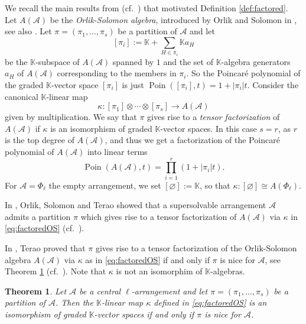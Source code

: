 \documentclass[12pt]{amsart}
\newcommand\CA{{\mathscr A}}
\newcommand\BBK{{\mathbb K}}
\newcommand\Poin{{\operatorname{Poin}}}
\numberwithin{equation}{section}
\theoremstyle{plain}
\newtheorem{theorem}[equation]{Theorem}
\theoremstyle{definition}
\begin{document}
We recall the main results from \cite{terao:factored}
(cf.\  \cite[\S 3.3]{orlikterao:arrangements}) that motivated
Definition \ref{def:factored}.
Let $A(\CA)$ be the \emph{Orlik-Solomon algebra}, introduced by Orlik and Solomon in \cite{orliksolomon:hyperplanes}, see also \cite{orlikterao:arrangements}.
Let $\pi = (\pi_1, \ldots, \pi_s)$ be a partition of $\CA$ and let
\[
[\pi_i] := \BBK + \sum_{H\in \pi_i} \BBK a_H
\]
be the $\BBK$-subspace of $A(\CA)$
spanned by $1$ and the set of $\BBK$-algebra generators $a_H$
of $A(\CA)$ corresponding to the members in $\pi_i$.
So the Poincar\'e polynomial of the graded $\BBK$-vector space $[\pi_i]$ is just
$\Poin([\pi_i],t) = 1 + | \pi_i| t$.
Consider the canonical $\BBK$-linear map
\begin{equation}
	\label{eq:factoredOS}
	\kappa : [\pi_1] \otimes \cdots \otimes [\pi_s] \to A(\CA)
\end{equation}
given by multiplication. We say that $\pi$ gives
rise to a \emph{tensor factorization} of
$A(\CA)$
if $\kappa$ is an isomorphism of graded $\BBK$-vector spaces. In this case
$s = r$, as $r$ is the top degree of $A(\CA)$, and thus we get
a factorization of the Poincar\'e polynomial of $A(\CA)$ into linear terms
\begin{equation}
	\label{eq:poinOS}
	\Poin(A(\CA),t) = \prod_{i=1}^r (1 + |\pi_i| t).
\end{equation}
For $\CA = \Phi_\ell$ the empty arrangement,
we set $[\varnothing] := \BBK$, so that
$\kappa : [\varnothing] \cong A(\Phi_\ell)$.


In \cite[Thm.\ 5.3]{orliksolomonterao:hyperplanes},
Orlik, Solomon and Terao showed that
a supersolvable arrangement $\CA$ admits a partition
$\pi$  which gives rise to a tensor factorization of $A(\CA)$
via $\kappa$  in \eqref{eq:factoredOS}
(cf.\ \cite[Thm.\ 3.81]{orlikterao:arrangements}).


In \cite[Thm.\ 2.8]{terao:factored},
Terao proved that
$\pi$ gives
rise to a tensor factorization of the Orlik-Solomon algebra $A(\CA)$
via $\kappa$
as in \eqref{eq:factoredOS}
if and only if
$\pi$ is
nice for
$\CA$, see Theorem \ref{thm:teraofactored}
(cf.\ \cite[Thm.\ 3.87]{orlikterao:arrangements}).
Note that $\kappa$ is not an isomorphim of $\BBK$-algebras.

\begin{theorem}
	\label{thm:teraofactored}
	Let $\CA$ be a central $\ell$-arrangement and let
	$\pi = (\pi_1, \ldots, \pi_s)$ be a partition of $\CA$.
	Then the $\BBK$-linear map $\kappa$
	defined in \eqref{eq:factoredOS}
	is an isomorphism of graded $\BBK$-vector spaces
	if and only if $\pi$ is nice for $\CA$.
\end{theorem}
\end{document}
